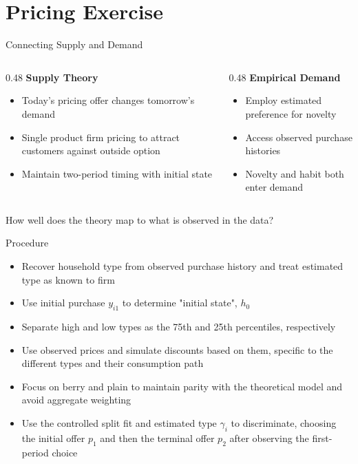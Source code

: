 \documentclass[aspectratio=169,professionalfonts]{beamer}
\begin{document}
\section{Pricing Exercise}
\begin{frame}{Connecting Supply and Demand}
  \begin{columns}[T]
    \begin{column}{0.48\textwidth}
      \textbf{Supply Theory}
      \begin{itemize}
        \item Today's pricing offer changes tomorrow's demand
        \item Single product firm pricing to attract customers against outside option
        \item Maintain two-period timing with initial state
      \end{itemize}
    \end{column}
    \begin{column}{0.48\textwidth}
      \textbf{Empirical Demand}
      \begin{itemize}
        \item Employ estimated preference for novelty
        \item Access observed purchase histories
        \item Novelty and habit both enter demand
      \end{itemize}
    \end{column}
  \end{columns}
  \begin{tcolorbox}
    How well does the theory map to what is observed in the data?
  \end{tcolorbox}
\end{frame}
\begin{frame}{Procedure}
  \begin{itemize}
    \item Recover household type from observed purchase history and treat estimated type as known to firm
    \item Use initial purchase $y_{i1}$ to determine "initial state", $h_0$
    \item Separate high and low types as the 75th and 25th percentiles, respectively
    \item Use observed prices and simulate discounts based on them, specific to the different types and their consumption path
    \item Focus on berry and plain to maintain parity with the theoretical model and avoid aggregate weighting
    \item Use the controlled split fit and estimated type $\gamma_i$ to discriminate, choosing the initial offer $p_1$ and then the terminal offer $p_2$ after observing the first-period choice
  \end{itemize}
\end{frame}
\end{document}
